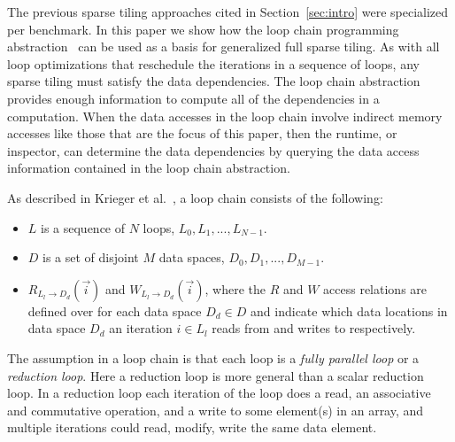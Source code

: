 The previous sparse tiling approaches cited in Section~\ref{sec:intro} 
were specialized per benchmark.
In this paper we show how the loop chain programming abstraction~\citep{ST-KriegerHIPS2013}
can be used as a basis for generalized full sparse tiling.
As with all loop optimizations that reschedule the iterations in a sequence of loops, 
any sparse tiling must satisfy the data dependencies.
The loop chain abstraction provides enough information 
to compute all of the dependencies in a computation.
When the data accesses in the loop chain involve indirect memory accesses
like those that are the focus of this paper, then the runtime, or inspector,
can determine the data dependencies by querying the data access information 
contained in the loop chain abstraction. %

As described in Krieger et al.~\cite{ST-KriegerHIPS2013}, a loop chain consists
of the following:
\begin{itemize}
\item $L$ is a sequence of $N$ loops, $L_0, L_1, ..., L_{N-1}$.
\item $D$ is a set of disjoint $M$ data spaces, $D_0, D_1, ..., D_{M-1}$.
\item $R_{L_l\rightarrow D_d}(\vec{i})$ and $W_{L_l\rightarrow D_d}(\vec{i})$, 
where the $R$ and $W$ access relations are defined over for each data space $D_d \in D$
and indicate 
which data locations in data space $D_d$ an iteration $i \in L_l$
reads from and writes to respectively.
\end{itemize}

The assumption in a loop chain is that each loop is a {\em fully parallel
loop} or a {\em reduction loop}.  Here a reduction loop is more general
than a scalar reduction loop.  In a reduction loop  
each iteration of the loop does a read, an associative and commutative operation, and a write
to some element(s) in an array, and multiple iterations could read, modify, write the
same data element.


